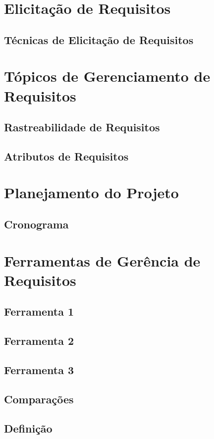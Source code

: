 \chapter[Elicitação de Requisitos]{Elicitação de Requisitos}
\section{Técnicas de Elicitação de Requisitos}

\chapter[Tópicos de Gerenciamento de Requisitos]{Tópicos de Gerenciamento de Requisitos}
\section{Rastreabilidade de Requisitos}
\section{Atributos de Requisitos}

\chapter[Planejamento do Projeto]{Planejamento do Projeto}
\section{Cronograma}

\chapter[Ferramentas de Gerência de Requisitos]{Ferramentas de Gerência de Requisitos}
\section{Ferramenta 1}
\section{Ferramenta 2}
\section{Ferramenta 3}
\section{Comparações}
\section{Definição}

